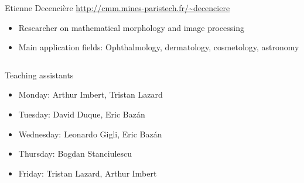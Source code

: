 \documentclass[xcolor=pdftex,dvipsnames,table,mathserif]{beamer}
\begin{document}
{\begin{columns}
\begin{column}{.8\textwidth}
    \begin{block}{Etienne Decencière \hfill \scriptsize{\url{http://cmm.mines-paristech.fr/\~decenciere}}}
      \scriptsize{
    \begin{itemize}
    \item Researcher on mathematical morphology and image processing
    \item Main application fields: Ophthalmology, dermatology, cosmetology, astronomy
    \end{itemize}
    }
  \end{block}

  \end{column}
\end{columns}



}

\begin{frame}{Teaching assistants}


      \begin{itemize}
        \item Monday: Arthur Imbert, Tristan Lazard
      \item Tuesday: David Duque, Eric Baz\'an
      \item Wednesday: Leonardo Gigli, Eric Baz\'an
      \item Thursday: Bogdan Stanciulescu
      \item Friday: Tristan Lazard, Arthur Imbert
      \end{itemize}



\end{frame}
\end{document}

